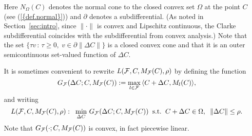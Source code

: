 \documentclass{siamltex}
\begin{document}
Here $N_{\Omega}(C)$ denotes the normal cone to the closed convex set
$\Omega$ at the point $C$ (see {(\ref{{def.normal}})}) and
$\partial$ denotes a subdifferential. (As noted in
Section~\ref{sec:intro}, since $\|\cdot\|$ is convex and Lipschitz
continuous, the Clarke subdifferential coincides with the
subdifferential from convex analysis.) Note that the set $\{ \tau v \,
: \, \tau \ge 0, \; v \in \partial \|{\Delta C}\|\}$ is a closed convex cone
and that it is an outer semicontinuous set-valued function of ${\Delta C}$.

It is sometimes convenient to rewrite $L({{\cal F}},C,M_{{\cal F}}(C),\rho)$ by
defining the function 
\begin{equation} \label{eq:defG}
G_{{\cal F}}({\Delta C};C,M_{{\cal F}}(C)) := \max_{l \in {{\cal F}}} \, \langle C + {\Delta C} , M_l(C) \rangle,
\end{equation}
and writing
\begin{equation} \label{eq:L.alt}
L({{\cal F}},C,M_{{\cal F}}(C),\rho): \;\; \min_{\Delta C} \, G_{{\cal F}}({\Delta C};C,M_{{\cal F}}(C)) 
\;\; \mbox{s.t.} \;\; C + {\Delta C}  \in \Omega, \;\; \|{\Delta C}\| \le \rho.
\end{equation}
Note that $G_{{\cal F}}(\cdot;C,M_{{\cal F}}(C))$ is convex, in fact piecewise
linear.
\end{document}
